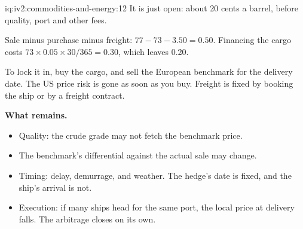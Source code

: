 \begin{solution}{iq:iv2:commodities-and-energy:12}
It is just open: about 20 cents a barrel, before quality, port and other fees.

Sale minus purchase minus freight: $77 - 73 - 3.50 = 0.50$. Financing the cargo costs $73 \times 0.05 \times 30/365 = 0.30$, which leaves 0.20.

To lock it in, buy the cargo, and sell the European benchmark for the delivery date. The US price risk is gone as soon as you buy. Freight is fixed by booking the ship or by a freight contract.

\textbf{What remains.}
\begin{itemize}
\item Quality: the crude grade may not fetch the benchmark price.
\item The benchmark's differential against the actual sale may change.
\item Timing: delay, demurrage, and weather. The hedge's date is fixed, and the ship's arrival is not.
\item Execution: if many ships head for the same port, the local price at delivery falls. The arbitrage closes on its own.
\end{itemize}

\end{solution}

